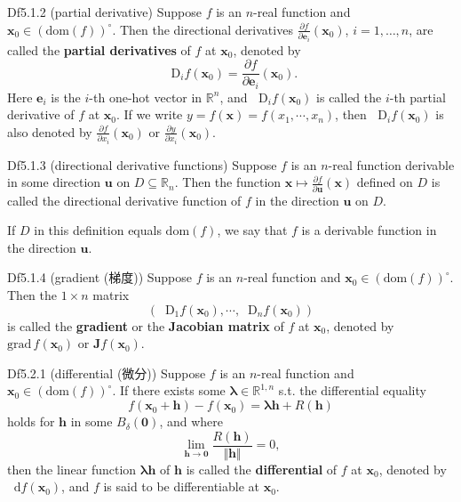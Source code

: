 \documentclass{article}
\newcommand{\parfrac}[2]{\frac{\partial #1}{\partial #2}}
\newcommand{\dif}{\mathop{}\!\mathrm{d}}
\newcommand{\Dif}{\mathop{}\!\mathrm{D}}
\begin{document}
\begin{Df}{Df5.1.2 (partial derivative)}
    Suppose $f$ is an $n$-real function and $\pmb{x}_0\in (\text{dom}(f))^\circ$. Then the directional derivatives $\parfrac{f}{\pmb{e}_i}(\pmb{x}_0)$, $i = 1, \dots, n$, are called the \textbf{partial derivatives} of $f$ at $\pmb{x}_0$, denoted by 
    $$\Dif_i f(\pmb{x}_0) = \parfrac{f}{\pmb{e}_i}(\pmb{x}_0).$$ 
    Here $\pmb{e}_i$ is the $i$-th one-hot vector in $\mathbb{R}^n$, and $\Dif_i f(\pmb{x}_0)$ is called the $i$-th partial derivative of $f$ at $\pmb{x}_0$. If we write $y = f(\pmb{x}) = f(x_1, \cdots, x_n)$, then $\Dif_i f(\pmb{x}_0)$ is also denoted by $\parfrac{f}{x_i}(\pmb{x}_0)$ or $\parfrac{y}{x_i}(\pmb{x}_0)$.
\end{Df}

\begin{Df}{Df5.1.3 (directional derivative functions)}
    Suppose $f$ is an $n$-real function derivable in some direction $\pmb{u}$ on $D\subseteq\mathbb{R}_n$. Then the function $\pmb{x}\mapsto \parfrac{f}{\pmb{u}}(\pmb{x})$ defined on $D$ is called the directional derivative function of $f$ in the direction $\pmb{u}$ on $D$.
\end{Df}

\begin{Rmk}{}
    \textcolor{Df}{If $D$ in this definition equals $\text{dom}(f)$, we say that $f$ is a derivable function in the direction $\pmb{u}$.}
\end{Rmk}

\begin{Df}{Df5.1.4 (gradient (梯度))}
    Suppose $f$ is an $n$-real function and $\pmb{x}_0\in (\text{dom}(f))^\circ$. Then the $1\times n$ matrix 
    $$(\Dif_1 f(\pmb{x}_0), \cdots, \Dif_n f(\pmb{x}_0))$$
    is called the \textbf{gradient} or the \textbf{Jacobian matrix} of $f$ at $\pmb{x}_0$, denoted by $\text{grad}\,f(\pmb{x}_0)$ or $\pmb{J}f(\pmb{x}_0)$.
\end{Df}

\begin{Df}{Df5.2.1 (differential (微分))}
    Suppose $f$ is an $n$-real function and $\pmb{x}_0\in (\text{dom}(f))^\circ$. If there exists some $\pmb{\lambda}\in\mathbb{R}^{1,n}$ s.t. the differential equality
    $$ f(\pmb{x}_0 + \pmb{h}) - f(\pmb{x}_0) = \pmb{\lambda}\pmb{h} + R(\pmb{h}) $$
    holds for $\pmb{h}$ in some $B_\delta(\pmb{0})$, and where 
    $$\lim_{\pmb{h}\to \pmb{0}}\frac{R(\pmb{h})}{\Vert \pmb{h}\Vert} = 0,$$
    then the linear function $\pmb{\lambda h}$ of $\pmb{h}$ is called the \textbf{differential} of $f$ at $\pmb{x}_0$, denoted by $\dif f(\pmb{x}_0)$, and $f$ is said to be differentiable at $\pmb{x}_0$.
\end{Df}
\end{document}
